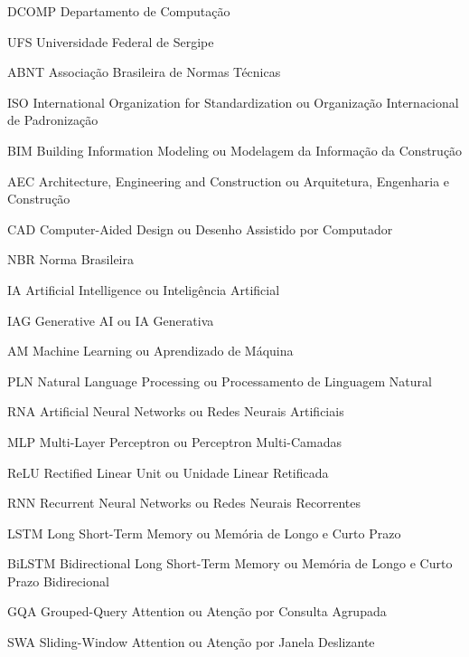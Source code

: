 
\begin{siglas}
    \item[DCOMP]{Departamento de Computação}
    \item[UFS]{Universidade Federal de Sergipe}
    \item[ABNT]{Associação Brasileira de Normas Técnicas}
    \item[ISO]{International Organization for Standardization ou Organização Internacional de Padronização}

    \item[BIM]{Building Information Modeling ou Modelagem da Informação da Construção}
    \item[AEC]{Architecture, Engineering and Construction ou Arquitetura, Engenharia e Construção}
    \item[CAD]{Computer-Aided Design ou Desenho Assistido por Computador}
    \item[NBR]{Norma Brasileira}

    \item[IA]{Artificial Intelligence ou Inteligência Artificial}
    \item[IAG]{Generative AI ou IA Generativa}
    \item[AM]{Machine Learning ou Aprendizado de Máquina}
    \item[PLN]{Natural Language Processing ou Processamento de Linguagem Natural}

    \item[RNA]{Artificial Neural Networks ou Redes Neurais Artificiais}
    \item[MLP]{Multi-Layer Perceptron ou Perceptron Multi-Camadas}
    \item[ReLU]{Rectified Linear Unit ou Unidade Linear Retificada}
    \item[RNN]{Recurrent Neural Networks ou Redes Neurais Recorrentes}
    \item[LSTM]{Long Short-Term Memory ou Memória de Longo e Curto Prazo}
    \item[BiLSTM]{Bidirectional Long Short-Term Memory ou Memória de Longo e Curto Prazo Bidirecional}
    \item[GQA]{Grouped-Query Attention ou Atenção por Consulta Agrupada}
    \item[SWA]{Sliding-Window Attention ou Atenção por Janela Deslizante}


\end{siglas}

